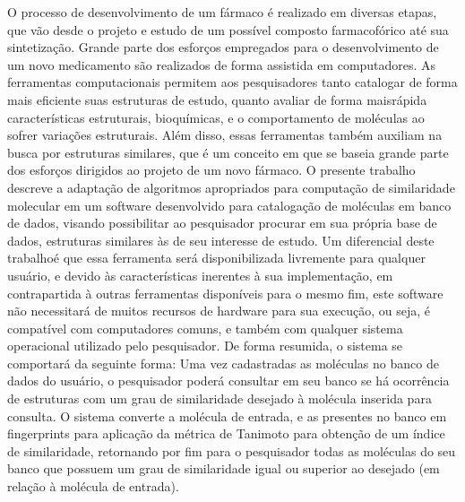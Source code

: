\begin{resumo}
O processo de desenvolvimento de um fármaco é realizado em diversas etapas, que vão desde
o projeto e estudo de um possível composto farmacofórico até sua sintetização. Grande parte
dos esforços empregados para o desenvolvimento de um novo medicamento são realizados de
forma assistida em computadores. As ferramentas computacionais permitem aos pesquisadores
tanto catalogar de forma mais eficiente suas estruturas de estudo, quanto avaliar de forma maisrápida características estruturais, bioquímicas, e o comportamento de moléculas ao sofrer
variações estruturais. Além disso, essas ferramentas também auxiliam na busca por estruturas
similares, que é um conceito em que se baseia grande parte dos esforços dirigidos ao projeto de um novo fármaco. O presente trabalho descreve a adaptação de algoritmos apropriados para
computação de similaridade molecular em um software desenvolvido para catalogação de
moléculas em banco de dados, visando possibilitar ao pesquisador procurar em sua própria
base de dados, estruturas similares às de seu interesse de estudo. Um diferencial deste trabalhoé que essa ferramenta será disponibilizada livremente para qualquer usuário, e devido às características inerentes à sua implementação, em contrapartida à outras ferramentas
disponíveis para o mesmo fim, este software não necessitará de muitos recursos de hardware
para sua execução, ou seja, é compatível com computadores comuns, e também com qualquer
sistema operacional utilizado pelo pesquisador. De forma resumida, o sistema se comportará da
seguinte forma: Uma vez cadastradas as moléculas no banco de dados do usuário, o
pesquisador poderá consultar em seu banco se há ocorrência de estruturas com um grau de
similaridade desejado à molécula inserida para consulta. O sistema converte a molécula de
entrada, e as presentes no banco em fingerprints para aplicação da métrica de Tanimoto para
obtenção de um índice de similaridade, retornando por fim para o pesquisador todas as
moléculas do seu banco que possuem um grau de similaridade igual ou superior ao desejado
(em relação à molécula de entrada).
\end{resumo}	

